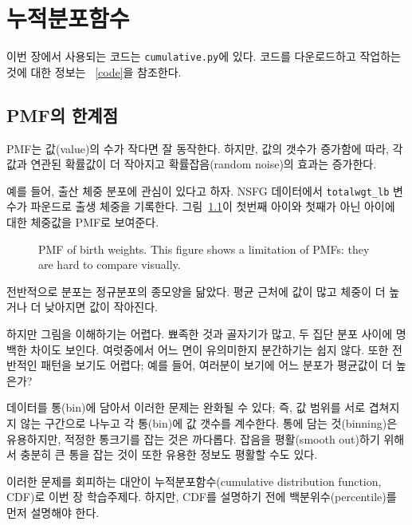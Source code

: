 
\chapter{누적분포함수}
\label{cumulative}

이번 장에서 사용되는 코드는 {\tt cumulative.py}에 있다.
코드를 다운로드하고 작업하는 것에 대한 정보는 ~\ref{code}을 참조한다.


\section{PMF의 한계점}

PMF는 값(value)의 수가 작다면 잘 동작한다. 하지만, 값의 갯수가 증가함에 따라,
각 값과 연관된 확률값이 더 작아지고 확률잡음(random noise)의 효과는 증가한다.

예를 들어, 출산 체중 분포에 관심이 있다고 하자. NSFG 데이터에서 
\verb"totalwgt_lb" 변수가 파운드로 출생 체중을 기록한다.
그림~\ref{nsfg_birthwgt_pmf}이 첫번째 아이와 첫째가 아닌 아이에 대한 체중값을 
PMF로 보여준다.

\begin{figure}
\caption{PMF of birth weights.  This figure shows a limitation
of PMFs: they are hard to compare visually.}
\label{nsfg_birthwgt_pmf}
\end{figure}

전반적으로 분포는 정규분포의 종모양을 닮았다.
평균 근처에 값이 많고 체중이 더 높거나 더 낮아지면 값이 작아진다.

하지만 그림을 이해하기는 어렵다. 뾰족한 것과 골자기가 많고, 두 집단 분포 사이에
명백한 차이도 보인다. 여럿중에서 어느 면이 유의미한지 분간하기는 쉽지 않다.
또한 전반적인 패턴을 보기도 어렵다; 예를 들어, 여러분이 보기에 어느 분포가 평균값이 더 높은가?

데이터를 통(bin)에 담아서 이러한 문제는 완화될 수 있다; 즉, 값 범위를 서로 겹쳐지지 않는 구간으로 
나누고 각 통(bin)에 값 갯수를 계수한다. 통에 담는 것(binning)은 유용하지만,
적정한 통크기를 잡는 것은 까다롭다. 잡음을 평활(smooth out)하기 위해서 충분히 큰 통을 잡는 것이 
또한 유용한 정보도 평활할 수도 있다.

이러한 문제를 회피하는 대안이 누적분포함수(cumulative
distribution function, CDF)로 이번 장 학습주제다. 하지만, CDF를 설명하기 전에 백분위수(percentile)를 먼저 설명해야 한다.


